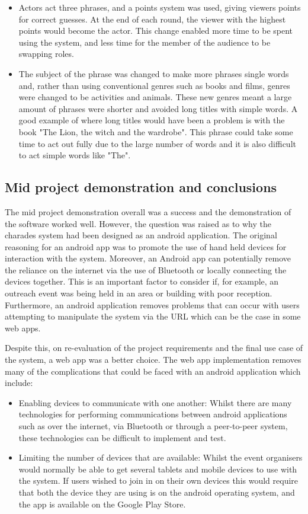 \begin{itemize}
	 \item Actors act three phrases, and a points system was used, giving viewers points for correct guesses. At the end of each round, the viewer with the highest points would become the actor. This change enabled more time to be spent using the system, and less time for the member of the audience to be swapping roles.
	 
	 \item The subject of the phrase was changed to make more phrases single words and, rather than using conventional genres such as books and films, genres were changed to be activities and animals. These new genres meant a large amount of phrases were shorter and avoided long titles with simple words. A good example of where long titles would have been a problem is with the book "The Lion, the witch and the wardrobe". This phrase could take some time to act out fully due to the large number of words and it is also difficult to act simple words like "The".
\end{itemize} 

\subsection{Mid project demonstration and conclusions}
The mid project demonstration overall was a success and the demonstration of the software worked well. However, the question was raised as to why the charades system had been designed as an android application. The original reasoning for an android app was to promote the use of hand held devices for interaction with the system. Moreover, an Android app can potentially remove the reliance on the internet via the use of Bluetooth or locally connecting the devices together. This is an important factor to consider if, for example, an outreach event was being held in an area or building with poor reception. Furthermore, an android application removes problems that can occur with users attempting to manipulate the system via the URL which can be the case in some web apps.

Despite this, on re-evaluation of the project requirements and the final use case of the system, a web app was a better choice. The web app implementation removes many of the complications that could be faced with an android application which include:
\begin{itemize}
	\item Enabling devices to communicate with one another: Whilst there are many technologies for performing communications between android applications such as over the internet, via Bluetooth or through a peer-to-peer system, these technologies can be difficult to implement and test.
	\item Limiting the number of devices that are available: Whilst the event organisers would normally be able to get several tablets and mobile devices to use with the system. If users wished to join in on their own devices this would require that both the device they are using is on the android operating system, and the app is available on the Google Play Store.
\end{itemize}

